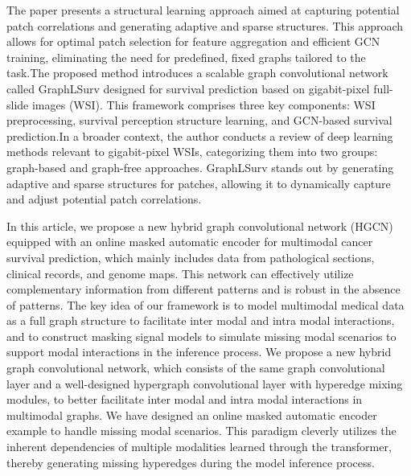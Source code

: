 \documentclass[journal,twoside,web]{ieeecolor}
\begin{document}
The paper\cite{liu2023graphlsurv} presents a structural learning approach aimed at capturing potential patch correlations and generating adaptive and sparse structures. This approach allows for optimal patch selection for feature aggregation and efficient GCN training, eliminating the need for predefined, fixed graphs tailored to the task.The proposed method introduces a scalable graph convolutional network called GraphLSurv designed for survival prediction based on gigabit-pixel full-slide images (WSI). This framework comprises three key components: WSI preprocessing, survival perception structure learning, and GCN-based survival prediction.In a broader context, the author conducts a review of deep learning methods relevant to gigabit-pixel WSIs, categorizing them into two groups: graph-based and graph-free approaches. GraphLSurv stands out by generating adaptive and sparse structures for patches, allowing it to dynamically capture and adjust potential patch correlations.



In this article, we propose a new hybrid graph convolutional network (HGCN) \cite{hou2023hybrid}equipped with an online masked automatic encoder for multimodal cancer survival prediction, which mainly includes data from pathological sections, clinical records, and genome maps. This network can effectively utilize complementary information from different patterns and is robust in the absence of patterns. The key idea of our framework is to model multimodal medical data as a full graph structure to facilitate inter modal and intra modal interactions, and to construct masking signal models to simulate missing modal scenarios to support modal interactions in the inference process. We propose a new hybrid graph convolutional network, which consists of the same graph convolutional layer and a well-designed hypergraph convolutional layer with hyperedge mixing modules, to better facilitate inter modal and intra modal interactions in multimodal graphs. We have designed an online masked automatic encoder example to handle missing modal scenarios. This paradigm cleverly utilizes the inherent dependencies of multiple modalities learned through the transformer, thereby generating missing hyperedges during the model inference process.
\end{document}
